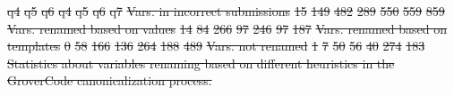 \documentclass[12pt,twoside]{mitthesis}
\providecommand{\DIFdeltex}[1]{{\protect\color{red}\sout{#1}}}                      %
\providecommand{\DIFdelFL}[1]{\DIFdel{#1}} %
\providecommand{\DIFdel}[1]{\texorpdfstring{\DIFdeltex{#1}}{}} %
\begin{document}
\DIFdelFL{q4 }%
\DIFdelFL{q5 }%
\DIFdelFL{q6 }%
\DIFdelFL{q4 }%
\DIFdelFL{q5 }%
\DIFdelFL{q6 }%
\DIFdelFL{q7 }%
\DIFdelFL{Vars. in incorrect submissions }%
\DIFdelFL{15 }%
\DIFdelFL{149 }%
\DIFdelFL{482 }%
\DIFdelFL{289 }%
\DIFdelFL{550 }%
\DIFdelFL{559 }%
\DIFdelFL{859 }%
\DIFdelFL{Vars. renamed based on values }%
\DIFdelFL{14 }%
\DIFdelFL{84 }%
\DIFdelFL{266 }%
\DIFdelFL{97 }%
\DIFdelFL{246 }%
\DIFdelFL{97 }%
\DIFdelFL{187 }%
\DIFdelFL{Vars. renamed based on templates }%
\DIFdelFL{0 }%
\DIFdelFL{58 }%
\DIFdelFL{166 }%
\DIFdelFL{136 }%
\DIFdelFL{264 }%
\DIFdelFL{188 }%
\DIFdelFL{489 }%
\DIFdelFL{Vars. not renamed }%
\DIFdelFL{1 }%
\DIFdelFL{7 }%
\DIFdelFL{50 }%
\DIFdelFL{56 }%
\DIFdelFL{40 }%
\DIFdelFL{274 }%
\DIFdelFL{183 }%
{%
\DIFdelFL{Statistics about variables renaming based on different heuristics in the GroverCode canonicalization process.}}
\end{document}
